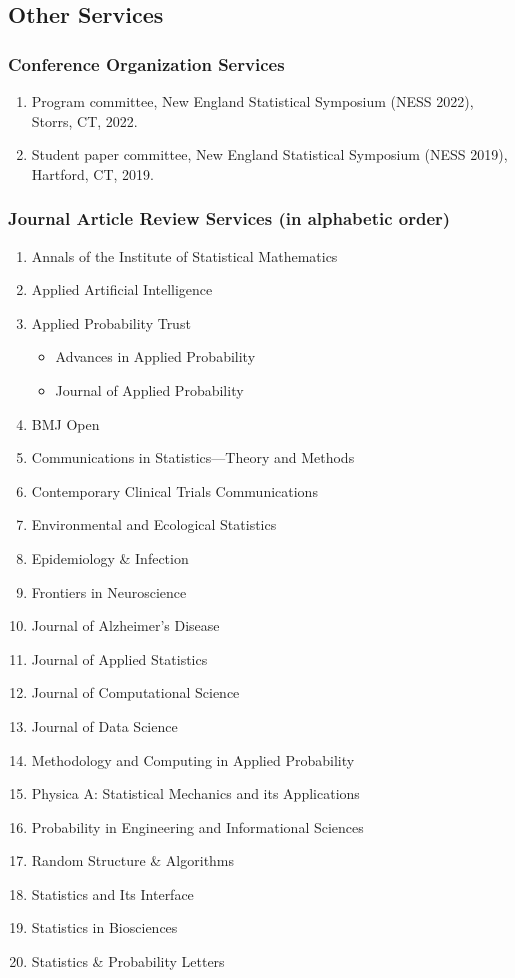 \documentclass{res}
\begin{document}
\begin{resume}
\section{Other Services}

\subsubsection{Conference Organization Services}
\begin{enumerate}
	\item Program committee, New England Statistical Symposium (NESS 
	2022), Storrs, CT, 2022.
	\item Student paper committee, New England Statistical Symposium 
	(NESS 2019), Hartford, CT, 2019.
\end{enumerate}

\subsubsection{Journal Article Review Services (in alphabetic order)}
\begin{enumerate}
	\item Annals of the Institute of Statistical Mathematics
	\item Applied Artificial Intelligence
	\item Applied Probability Trust
	\begin{itemize}
		\item Advances in Applied Probability 
		\item Journal of Applied Probability
	\end{itemize}
	\item BMJ Open
	\item Communications in Statistics---Theory and Methods
	\item Contemporary Clinical Trials Communications
	\item Environmental and Ecological Statistics
	\item Epidemiology \& Infection
	\item Frontiers in Neuroscience
	\item Journal of Alzheimer's Disease
	\item Journal of Applied Statistics
	\item Journal of Computational Science 
	\item Journal of Data Science
	\item Methodology and Computing in Applied Probability
	\item Physica A: Statistical Mechanics and its Applications
	\item Probability in Engineering and Informational Sciences
	\item Random Structure \& Algorithms
	\item Statistics and Its Interface
	\item Statistics in Biosciences
	\item Statistics \& Probability Letters
\end{enumerate}


\end{resume}
\end{document}
